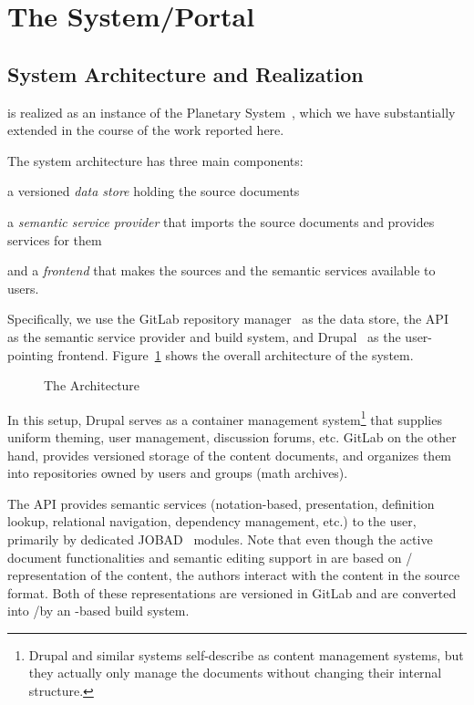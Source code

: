 \section{The \sys System/Portal}\label{sec:mathhub}

\subsection{System Architecture and Realization}\label{sec:arch}

\sys is realized as an instance of the Planetary System~\cite{Kohlhase:ppte12}, which we
have substantially extended in the course of the work reported here.

The system architecture has three main components: 
\begin{compactenum}[\em i\rm)]
 \item a versioned \emph{data store} holding the source documents
 \item a \emph{semantic service provider} that imports the source documents and provides services for them 
 \item and a \emph{frontend} that makes the sources and the semantic services available to users.
\end{compactenum}
Specifically, we use the GitLab repository manager~\cite{GitLab:on} as the data store, the
\mmt API~\cite{Rabe:MAGMS13,uniformal:on} as the semantic service provider and build
system, and Drupal~\cite{drupal:on} as the user-pointing frontend. Figure~\ref{fig:arch}
shows the overall architecture of the \sys system.

\begin{figure}[ht]\centering

\caption{The \sys Architecture}\label{fig:arch}
\end{figure}

In this setup, Drupal serves as a container management system\footnote{Drupal and similar
  systems self-describe as content management systems, but they actually only manage the
  documents without changing their internal structure.} that supplies uniform theming,
user management, discussion forums, etc. GitLab on the other hand, provides versioned
storage of the content documents, and organizes them into repositories owned by users and
groups (math archives).

The \mmt API provides semantic services (notation-based, presentation, definition lookup,
relational navigation, dependency management, etc.) to the user, primarily by dedicated
JOBAD~\cite{GLR:WebSvcActMathDoc09} modules. Note that even though the active document 
functionalities and semantic editing support in \sys are based on \omdoc/\mmt
representation of the content, the authors interact with the content in the source
format. Both of these representations are versioned in GitLab and are converted into
\omdoc/\mmt by an \mmt-based build system. 

